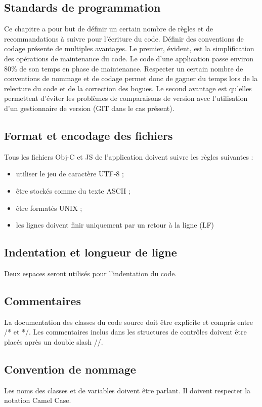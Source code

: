 \documentclass[a4paper,12pt]{report}
\begin{document}
\begin{onehalfspace}
\chapter{Standards de programmation}

Ce chapitre a pour but de définir un certain nombre de règles et de recommandations à suivre pour l'écriture du code. Définir des conventions de codage présente de multiples avantages. Le premier, évident, est la simplification des opérations de maintenance du code. Le code d'une application passe environ 80\% de son temps en phase de maintenance. Respecter un certain nombre de conventions de nommage et de codage permet donc de gagner du temps lors de la relecture du code et de la correction des bogues. Le second avantage est qu'elles permettent d'éviter les problèmes de comparaisons de version avec l'utilisation d'un gestionnaire de version (GIT dans le cas présent).

\section{Format et encodage des fichiers}

Tous les fichiers Obj-C et JS de l'application doivent suivre les règles suivantes :
\begin{itemize}
	\item utiliser le jeu de caractère UTF-8 ;
	\item être stockés comme du texte ASCII ;
	\item être formatés UNIX ;
	\item les lignes doivent finir uniquement par un retour à la ligne (LF)
\end{itemize}

\section{Indentation et longueur de ligne}
Deux espaces seront utilisés pour l'indentation du code. 

\section{Commentaires}

La documentation des classes du code source doit être explicite et compris entre /* et */.
Les commentaires inclus dans les structures de contrôles doivent être placés après un double slash //.

\newpage

\section{Convention de nommage}
Les noms des classes et de variables doivent être parlant. Il doivent respecter la notation Camel Case.


\end{onehalfspace}
\end{document}
